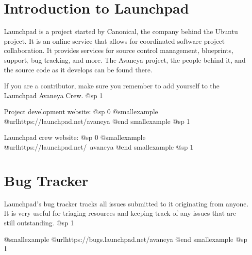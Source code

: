 \section{Introduction to Launchpad}

Launchpad is a project started by Canonical, the company behind the Ubuntu project. It is an online service that allows for coordinated software project collaboration. It provides services for source control management, blueprints, support, bug tracking, and more. The Avaneya project, the people behind it, and the source code as it develops can be found there.

If you are a contributor, make sure you remember to add yourself to the Launchpad Avaneya Crew.
@sp 1

Project development website:
@sp 0
@smallexample
@url{https://launchpad.net/avaneya}
@end smallexample
@sp 1

Launchpad crew website:
@sp 0
@smallexample
@url{https://launchpad.net/~avaneya}
@end smallexample
@sp 1

\section{Bug Tracker}
Launchpad's bug tracker tracks all issues submitted to it originating from anyone. It is very useful for triaging resources and keeping track of any issues that are still outstanding.
@sp 1

@smallexample
@url{https://bugs.launchpad.net/avaneya}
@end smallexample
@sp 1

